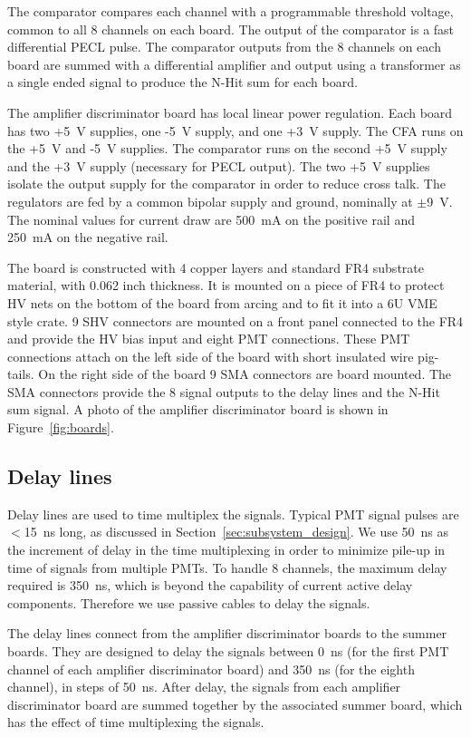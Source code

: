 \documentclass[review,number,sort&compress]{elsarticle}
\begin{document}
The comparator compares each channel with a programmable threshold
voltage, common to all 8 channels on each board. The output of the
comparator is a fast differential PECL pulse. The comparator outputs
from the 8 channels on each board are summed with a differential
amplifier and output using a transformer as a single ended signal to
produce the N-Hit sum for each board.

The amplifier discriminator board has local linear power regulation.
Each board has two +5~V supplies, one -5~V supply, and one +3~V
supply.  The CFA runs on the +5~V and -5~V supplies. The comparator
runs on the second +5~V supply and the +3~V supply (necessary for PECL
output).  The two +5~V supplies isolate the output supply for the
comparator in order to reduce cross talk. The regulators are fed by a
common bipolar supply and ground, nominally at $\pm$9~V. The nominal
values for current draw are 500~mA on the positive rail and 250~mA on
the negative rail.

The board is constructed with 4 copper layers and standard FR4
substrate material, with 0.062 inch thickness. It is mounted on a piece
of FR4 to protect HV nets on the bottom of the board from arcing and
to fit it into a 6U VME style crate. 9 SHV connectors are mounted on
a front panel connected to the FR4 and provide the HV bias input and
eight PMT connections. These PMT connections attach on the left side
of the board with short insulated wire pig-tails. On the right
side of the board 9 SMA connectors are board mounted. The SMA
connectors provide the 8 signal outputs to the delay lines and the
N-Hit sum signal. A photo of the amplifier discriminator
board is shown in Figure~\ref{fig:boards}.

\subsection{Delay lines}
\label{sec:Delay}
%
Delay lines are used to time multiplex the signals.  Typical PMT
signal pulses are $<$15~ns long, as discussed in
Section~\ref{sec:subsystem_design}.  We use 50~ns as the increment
of delay in the time multiplexing in order to minimize pile-up in time
of signals from multiple PMTs.  To handle 8 channels, the maximum
delay required is 350~ns, which is beyond the capability of current
active delay components.  Therefore we use passive cables to delay the signals.

The delay lines connect from the amplifier discriminator boards to the
summer boards. They are designed to delay the signals between 0~ns
(for the first PMT channel of each amplifier discriminator board) and
350~ns (for the eighth channel), in steps of 50~ns.  After delay, the
signals from each amplifier discriminator board are summed together by
the associated summer board, which has the effect of time multiplexing
the signals.  
\end{document}
